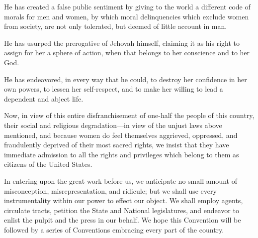 He has created a false public sentiment by giving to the world a
different code of morals for men and women, by which moral
delinquencies which exclude women from society, are not only
tolerated, but deemed of little account in man.

He has usurped the prerogative of Jehovah himself, claiming it as his
right to assign for her a sphere of action, when that belongs to her
conscience and to her God.

He has endeavored, in every way that he could, to destroy her
confidence in her own powers, to lessen her self-respect, and to make
her willing to lead a dependent and abject life.

Now, in view of this entire disfranchisement of one-half the people of
this country, their social and religious degradation---in view of the
unjust laws above mentioned, and because women do feel themselves
aggrieved, oppressed, and fraudulently deprived of their most sacred
rights, we insist that they have immediate admission to all the rights
and privileges which belong to them as citizens of the United States.

In entering upon the great work before us, we anticipate no small
amount of misconception, misrepresentation, and ridicule; but we shall
use every instrumentality within our power to effect our object. We
shall employ agents, circulate tracts, petition the State and National
legislatures, and endeavor to enlist the pulpit and the press in our
behalf. We hope this Convention will be followed by a series of
Conventions embracing every part of the country.

